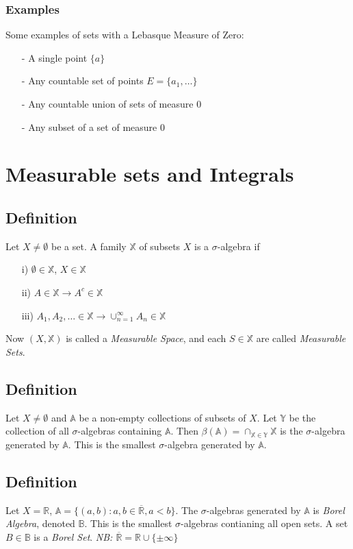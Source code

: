 \documentclass[a4paper, 12pt, twoside]{article}
\begin{document}
            \subsubsection{Examples}
                Some examples of sets with a Lebasque Measure of Zero:
                \begin{itemize}
                    \item[-] A single point $\{a\}$
                    \item[-] Any countable set of points $E=\{a_{1},\dots\}$
                    \item[-] Any countable union of sets of measure $0$
                    \item[-] Any subset of a set of measure $0$
                \end{itemize}

    \newpage
    \section{Measurable sets and Integrals}
        \subsection{Definition}
            Let $X\neq\emptyset$ be a set. A family  $\mathbb{X}$ of subsets $X$ is a $\sigma$-algebra if
            \begin{itemize}
                \item[i)] $\emptyset \in  \mathbb{X}$, $X \in \mathbb{X}$
                \item[ii)] $A\in \mathbb{X} \rightarrow A^{c} \in \mathbb{X}$
                \item[iii)] $A_{1},A_{2},\dots \in \mathbb{X} \rightarrow \cup_{n=1}^{\infty}A_{n}\in \mathbb{X}$
            \end{itemize}
            Now $(X,\mathbb{X})$ is called a \emph{Measurable Space}, and each $S\in\mathbb{X}$ are called \emph{Measurable Sets}.
        \subsection{Definition}
            Let $X\neq\emptyset$ and $\mathbb{A}$ be a non-empty collections of subsets of $X$. Let $\mathbb{Y}$ be the collection of all $\sigma$-algebras containing $\mathbb{A}$. Then $\beta(\mathbb{A})=\cap_{\mathbb{X}\in\mathbb{Y}}\mathbb{X}$ is the $\sigma$-algebra generated by $\mathbb{A}$. This is the smallest $\sigma$-algebra generated by $\mathbb{A}$.
        \subsection{Definition}
            Let $X=\mathbb{R}$, $\mathbb{A}=\{(a,b):a,b\in\overline{\mathbb{R}},a<b\}$. The $\sigma$-algebras generated by $\mathbb{A}$ is \emph{Borel Algebra}, denoted $\mathbb{B}$. This is the smallest $\sigma$-algebras contianing all open sets. A set $B\in \mathbb{B}$ is a \emph{Borel Set}.
            \textit{NB: $\overline{\mathbb{R}}=\mathbb{R}\cup \{\pm\infty\}$}
\end{document}
